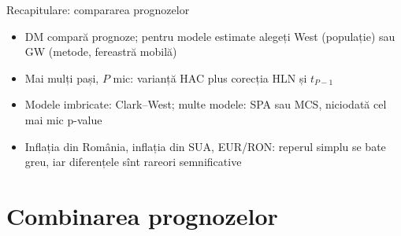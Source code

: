 \begin{frame}{Recapitulare: compararea prognozelor}
\itemsize{\small}
\begin{itemize}
    \item DM compară prognoze; pentru modele estimate alegeți West (populație) sau GW (metode, fereastră mobilă)
    \item Mai mulți pași, $P$ mic: varianță HAC plus corecția HLN și $t_{P-1}$
    \item Modele imbricate: Clark--West; multe modele: SPA sau MCS, niciodată cel mai mic p-value
    \item Inflația din România, inflația din SUA, EUR/RON: reperul simplu se bate greu, iar diferențele sînt rareori semnificative
\end{itemize}
\end{frame}


\section{Combinarea prognozelor}

